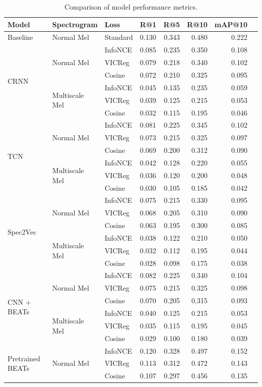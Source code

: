 \documentclass[11pt]{article}
\begin{document}
\begin{table}[h]
\centering
\caption{Comparison of model performance metrics.}
\label{tab:results}
\small
\begin{tabular}{llllrrrr}
\toprule
Model & Spectrogram & Loss & R@1 & R@5 & R@10 & mAP@10 \\
\midrule
Baseline & Normal Mel & Standard & 0.130 & 0.343 & 0.480 & 0.222 \\
\midrule
\multirow{6}{*}{CRNN}
 & \multirow{3}{*}{Normal Mel} & InfoNCE & 0.085 & 0.235 & 0.350 & 0.108 \\
 & & VICReg & 0.079 & 0.218 & 0.340 & 0.102 \\
 & & Cosine & 0.072 & 0.210 & 0.325 & 0.095 \\
 & \multirow{3}{*}{Multiscale Mel} & InfoNCE & 0.045 & 0.135 & 0.235 & 0.059 \\
 & & VICReg & 0.039 & 0.125 & 0.215 & 0.053 \\
 & & Cosine & 0.032 & 0.115 & 0.195 & 0.046 \\
\midrule
\multirow{6}{*}{TCN}
 & \multirow{3}{*}{Normal Mel} & InfoNCE & 0.081 & 0.225 & 0.345 & 0.102 \\
 & & VICReg & 0.073 & 0.215 & 0.325 & 0.097 \\
 & & Cosine & 0.069 & 0.200 & 0.312 & 0.090 \\
 & \multirow{3}{*}{Multiscale Mel} & InfoNCE & 0.042 & 0.128 & 0.220 & 0.055 \\
 & & VICReg & 0.036 & 0.120 & 0.200 & 0.048 \\
 & & Cosine & 0.030 & 0.105 & 0.185 & 0.042 \\
\midrule
\multirow{6}{*}{Spec2Vec}
 & \multirow{3}{*}{Normal Mel} & InfoNCE & 0.075 & 0.215 & 0.330 & 0.095 \\
 & & VICReg & 0.068 & 0.205 & 0.310 & 0.090 \\
 & & Cosine & 0.063 & 0.195 & 0.300 & 0.085 \\
 & \multirow{3}{*}{Multiscale Mel} & InfoNCE & 0.038 & 0.122 & 0.210 & 0.050 \\
 & & VICReg & 0.032 & 0.112 & 0.195 & 0.044 \\
 & & Cosine & 0.028 & 0.098 & 0.175 & 0.038 \\
\midrule
\multirow{6}{*}{CNN + BEATs}
 & \multirow{3}{*}{Normal Mel} & InfoNCE & 0.082 & 0.225 & 0.340 & 0.104 \\
 & & VICReg & 0.075 & 0.215 & 0.325 & 0.098 \\
 & & Cosine & 0.070 & 0.205 & 0.315 & 0.093 \\
 & \multirow{3}{*}{Multiscale Mel} & InfoNCE & 0.040 & 0.125 & 0.215 & 0.053 \\
 & & VICReg & 0.035 & 0.115 & 0.195 & 0.045 \\
 & & Cosine & 0.029 & 0.100 & 0.180 & 0.039 \\
\midrule
\multirow{3}{*}{Pretrained BEATs}
 & \multirow{3}{*}{Normal Mel} & InfoNCE & 0.120 & 0.328 & 0.497 & 0.152 \\
 & & VICReg & 0.113 & 0.312 & 0.472 & 0.143 \\
 & & Cosine & 0.107 & 0.297 & 0.456 & 0.135 \\
\bottomrule
\end{tabular}
\end{table}
\end{document}
